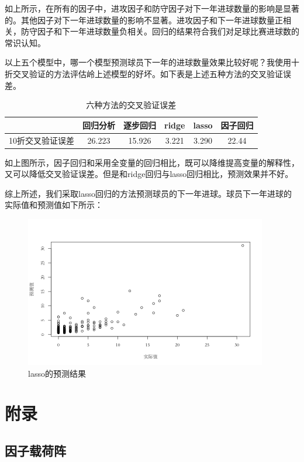 \documentclass[12pt,a4paper,onecolumn]{article}
\begin{document}
如上所示，在所有的因子中，进攻因子和防守因子对下一年进球数量的影响是显著的。其他因子对下一年进球数量的影响不显著。进攻因子和下一年进球数量正相关，防守因子和下一年进球数量负相关。回归的结果符合我们对足球比赛进球数的常识认知。

以上五个模型中，哪一个模型预测球员下一年的进球数量效果比较好呢？我使用十折交叉验证的方法评估岭上述模型的好坏。如下表是上述五种方法的交叉验证误差。

\begin{table}[H]
\centering
\caption{六种方法的交叉验证误差}
\begin{tabular}{cccccc}
  \hline
	      & 回归分析 & 逐步回归 &  ridge &  lasso & 因子回归 \\\hline
		10折交叉验证误差 & 26.223 & 15.926 & 3.221 & 3.290 & 22.44 \\
    \hline
  \end{tabular}
\end{table}

如上图所示，因子回归和采用全变量的回归相比，既可以降维提高变量的解释性，又可以降低交叉验证误差。但是和ridge回归与lasso回归相比，预测效果并不好。

综上所述，我们采取lasso回归的方法预测球员的下一年进球。球员下一年进球的实际值和预测值如下所示：

\begin{figure}[H]
\centering
\includegraphics[width=300pt]{Rplot.png}
\caption{\small{lasso的预测结果}}
\end{figure}

\section{附录}

\subsection{因子载荷阵}
\end{document}
